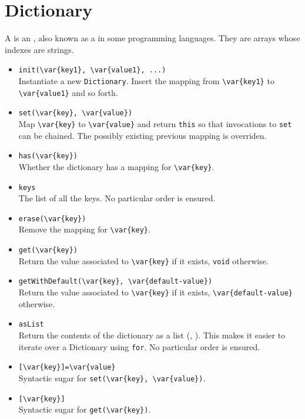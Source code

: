 \section{Dictionary}

A  is an , also known as a
 in some programming languages.  They are arrays whose
indexes are strings.

\begin{itemize}
\item \lstinline|init(\var{key1}, \var{value1}, ...)|~\\
  Instantiate a new \lstinline|Dictionary|.  Insert the mapping from
  \lstinline|\var{key1}| to \lstinline|\var{value1}| and so forth.

\item \lstinline|set(\var{key}, \var{value})|\\
  Map \lstinline|\var{key}| to \lstinline|\var{value}| and return
  \lstinline|this| so that invocations to \lstinline|set| can be
  chained.  The possibly existing previous mapping is overriden.

\item \lstinline|has(\var{key})|\\
  Whether the dictionary has a mapping for \lstinline|\var{key}|.

\item \lstinline|keys|\\
  The list of all the keys.  No particular order is ensured.

\item \lstinline|erase(\var{key})|\\
  Remove the mapping for \lstinline|\var{key}|.

\item \lstinline|get(\var{key})|\\
  Return the value associated to  \lstinline|\var{key}| if it exists,
  \lstinline|void| otherwise.

\item \lstinline|getWithDefault(\var{key}, \var{default-value})|\\
  Return the value associated to  \lstinline|\var{key}| if it exists,
  \lstinline|\var{default-value}| otherwise.

\item \lstinline|asList|\\
  Return the contents of the dictionary as a  list
  (, ).  This makes it easier to iterate over a
  Dictionary using \lstinline|for|.  No particular order is ensured.

\item \lstinline|[\var{key}]=\var{value}|\\
  Syntactic sugar for \lstinline|set(\var{key}, \var{value})|.

\item \lstinline|[\var{key}]|\\
  Syntactic sugar for \lstinline|get(\var{key})|.
\end{itemize}

